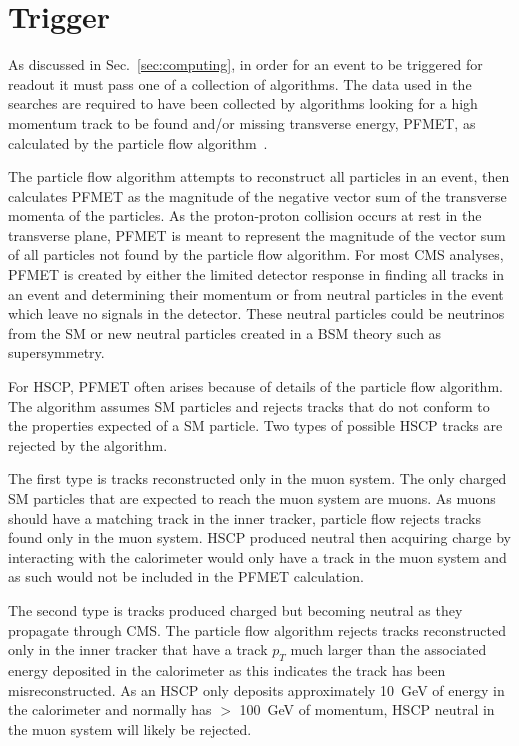 \section{Trigger \label{sec:trigger}}
As discussed in Sec.~\ref{sec:computing}, in order for an event to be triggered for readout it must pass one of a collection of algorithms.
The data used in the searches are required to have been collected by algorithms looking for a high momentum track to be found
and/or missing transverse energy, PFMET, as calculated by the particle flow algorithm~\cite{CMS:2010xta}. 

The particle flow algorithm attempts
to reconstruct all particles in an event, then calculates PFMET as the magnitude of the negative vector sum of the transverse momenta of the particles. 
As the proton-proton collision occurs
at rest in the transverse plane, PFMET is meant to represent the magnitude of the vector sum of all particles not found by the particle flow algorithm.
For most CMS analyses, PFMET is created
by either the limited detector response in finding all tracks in an event and determining their momentum or from neutral particles in the event which leave no signals
in the detector. These neutral particles could be neutrinos from the SM or new neutral particles created in a BSM theory such as supersymmetry. 

For HSCP, PFMET often arises because of details of the particle flow algorithm. The algorithm assumes SM particles and rejects tracks that do not conform to the properties expected
of a SM particle. Two types of possible HSCP tracks are rejected by the algorithm. 

The first type is tracks reconstructed only in the muon system. The only charged SM particles that
are expected to reach the muon system are muons. As muons should have a matching track in the inner tracker, particle flow rejects tracks found only in the
muon system. HSCP produced neutral then acquiring charge by interacting with the calorimeter
would only have a track in the muon system and as such would not be included in the PFMET calculation. 

The second type is tracks produced charged but becoming neutral as they propagate through CMS.
The particle flow algorithm rejects tracks reconstructed only in the inner tracker that have a track $p_T$ much larger
than the associated energy deposited in the calorimeter as this indicates the track has been misreconstructed.
As an HSCP only deposits approximately 10~GeV of energy in the calorimeter and normally has $>$ 100~GeV of momentum, HSCP neutral in the muon system will likely be rejected. 

